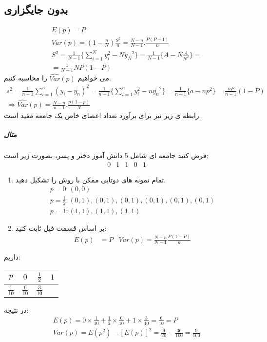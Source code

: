 \subsection*{بدون جایگزاری}
\begin{gather*}
	E(p)=P \\
	Var(p)=(1-\frac{n}{N})\frac{S^2}{n}=\frac{N-n}{N-1}.\frac{P(P-1) }{n}\\
	S^2=\frac{1}{N-1}\{\sum_{i=1}^Ny_i^2-N\bar{y_N}^2\}=
	\frac{1}{N-1}\{A-N\frac{A}{N^2}\}
	=\\=
	\frac{1}{N-1}NP(1-P)
\end{gather*}
می خواهیم 
$\hat{Var}(p)$
را محاسبه کنیم.
\begin{multline*}
	s^2=\frac{1}{n-1}\sum_{i=1}^{n}(y_i-\bar{y_n})^2
	=\frac{1}{n-1}\{\sum_{i=1}^ny_i^2 -n\bar{y_n}^2\}
	=\frac{1}{n-1}\{a-np^2\}=\frac{nP}{n-1}(1-P) \\
	\Rightarrow 
	\hat{Var}(p)=\frac{N-n}{n-1}.\frac{p(1-p)}{N}
\end{multline*}
رابطه ی زیر نیز برای برآورد تعداد اعضای خاص یک جامعه مفید است.
\subparagraph*{مثال}
فرض کنید جامعه ای شامل 5 دانش آموز دختر و پسر، بصورت زیر است:
\begin{equation*}
	\begin{matrix}
		0 & 1 & 1 & 0 & 1
	\end{matrix}
\end{equation*}
\begin{enumerate}
	\item تمام نمونه های دوتایی ممکن با روش
	را تشکیل دهید.
	\begin{gather*}
		p=0:(0,0)\\
		p=\frac{1}{2}:(0,1),(0,1),(0,1),(0,1),(0,1),(0,1) \\
		p=1:(1,1),(1,1),(1,1)
	\end{gather*}
	\item بر اساس قسمت قبل ثابت کنید:
	\begin{align*}
		E(p)&=P & Var(p)=\frac{N-n}{N-1}\frac{P(1-P)}{n}
	\end{align*}
\end{enumerate}
داریم:
\begin{LTR}
	\begin{tabular}{c|ccc}
		$p$ & $0$ & $\frac{1}{2}$ & $1$ \\
		\hline
		$\frac{1}{10}$ & $\frac{6}{10}$ & $\frac{3}{10}$
	\end{tabular}
\end{LTR}
در نتیجه:
\begin{gather*}
	E(p)=0\times\frac{1}{10}+\frac{1}{2}\times\frac{6}{10}+1\times\frac{3}{10}=\frac{6}{10}=P \\
	Var(p)=E(p^2)-[E(p)]^2=\frac{9}{20}-\frac{36}{100}=\frac{9}{100}
\end{gather*}
